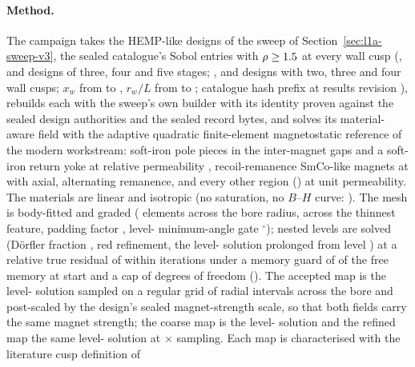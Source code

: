 \paragraph{Method.}
The campaign takes the \HmcDesignCount{} HEMP-like designs of the sweep of
Section~\ref{sec:l1a-sweep-v3}, the sealed catalogue's Sobol entries with
$\rho \ge 1.5$ at every wall cusp (\HmcStageThreeDesigns,
\HmcStageFourDesigns{} and \HmcStageFiveDesigns{} designs of three, four and five stages;
\HmcCuspTwoDesigns, \HmcCuspThreeDesigns{} and \HmcCuspFourDesigns{} designs with two, three
and four wall cusps; $x_w$ from \HmcXwMin{} to \HmcXwMax, $r_w/L$ from \HmcRwOverLMin{} to
\HmcRwOverLMax; catalogue hash prefix \texttt{\HmcSweepCatalogueSha} at results revision
\texttt{\HmcSweepResultsCommit}), rebuilds each with the sweep's own builder with its identity
proven against the sealed design authorities and the sealed \HmcFieldModelLevelLOneA{} record
bytes, and solves its material-aware field with the adaptive quadratic finite-element
magnetostatic reference of the modern workstream: soft-iron pole pieces in the inter-magnet
gaps and a soft-iron return yoke at relative permeability \HmcIronMuR, recoil-remanence
SmCo-like magnets at \HmcMagnetRecoilMuR{} with axial, alternating remanence, and every other
region (\HmcVacuumLikeRegions) at unit permeability. The materials are linear and isotropic
(no saturation, no $B$--$H$ curve: \HmcLinearMaterials). The mesh is body-fitted and graded
(\HmcBoreElements{} elements across the bore radius, \HmcFeatureElements{} across the
thinnest feature, padding factor \HmcPaddingFactor, level-\HmcLevelZeroToken{}
minimum-angle gate \HmcAngleGateDeg$^\circ$); \HmcAdaptiveLevels{} nested levels are solved
(D\"orfler fraction \HmcDorflerTheta, red refinement, the level-\HmcLevelOneToken{} solution
prolonged from level \HmcLevelZeroToken) at a relative true residual of \HmcSolverRelTol{}
within \HmcSolverMaxIter{} iterations under a memory guard of \HmcRamBudgetFraction{} of the
free memory at start and a cap of \HmcDofCap{} degrees of freedom
(\texttt{\HmcSolverBackend}). The accepted map is the level-\HmcLevelOneToken{} solution
sampled on a regular grid of \HmcRadialIntervals{} radial intervals across the bore and
post-scaled by the design's sealed magnet-strength scale, so that both fields carry the same
magnet strength; the coarse map is the level-\HmcLevelZeroToken{} solution and the refined
map the same level-\HmcLevelOneToken{} solution at $\times$\HmcSamplingRefinement{} sampling.
Each map is characterised with the literature cusp definition of
